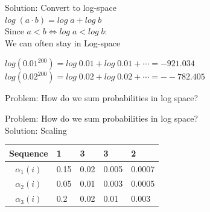 \begin{frame}
\center
Solution: Convert to log-space\\
$log \; (a \cdot b) = log \; a + log \; b$\\
\vspace{20pt}
Since $a < b \iff log \; a < log \; b$:\\
\vspace{20pt} 
We can often stay in Log-space
\end{frame}

\begin{frame}
\center
$log (0.01^{200}) = log \; 0.01 + log \; 0.01 + \cdots = -921.034$\\
\vspace{20pt}
$log (0.02^{200}) = log \; 0.02 + log \; 0.02 + \cdots = --782.405$
\end{frame}

\begin{frame}
\center
Problem: How do we sum probabilities in log space?
\end{frame}

\begin{frame}
\center
Problem: How do we sum probabilities in log space?\\
\vspace{20pt}
Solution: Scaling
\end{frame}

\begin{frame}
\begin{table}[h]
\begin{tabular}{|c|l|l|l|l|}
 \hline
Sequence      & 1     & 3    & 3     & 2      \\ \hline
$\alpha_1(i)$          & 0.15  & 0.02 & 0.005 & 0.0007 \\ \hline
$\alpha_2(i)$          & 0.05  & 0.01 & 0.003 & 0.0005 \\ \hline
$\alpha_3(i)$          & 0.2   & 0.02 & 0.01  & 0.003  \\ \hline
\end{tabular}
\end{table}
\end{frame}

